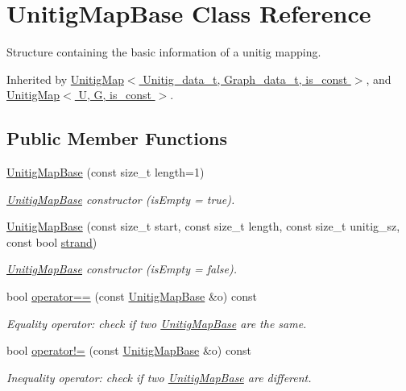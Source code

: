 \hypertarget{structUnitigMapBase}{}\section{Unitig\+Map\+Base Class Reference}
\label{structUnitigMapBase}


Structure containing the basic information of a unitig mapping.  




Inherited by \hyperlink{classUnitigMap}{Unitig\+Map$<$ Unitig\+\_\+data\+\_\+t, Graph\+\_\+data\+\_\+t, is\+\_\+const $>$}, and \hyperlink{classUnitigMap}{Unitig\+Map$<$ U, G, is\+\_\+const $>$}.

\subsection*{Public Member Functions}
\begin{DoxyCompactItemize}
\item 
\hyperlink{structUnitigMapBase_a080e546f9f6a9027490501332b656473}{Unitig\+Map\+Base} (const size\+\_\+t length=1)
\begin{DoxyCompactList}\small\item\em \hyperlink{structUnitigMapBase}{Unitig\+Map\+Base} constructor (is\+Empty = true). \end{DoxyCompactList}\item 
\hyperlink{structUnitigMapBase_a04975745bfe61f5d067acb13940d2975}{Unitig\+Map\+Base} (const size\+\_\+t start, const size\+\_\+t length, const size\+\_\+t unitig\+\_\+sz, const bool \hyperlink{structUnitigMapBase_a6de6f4a1ccef220e84d097bc3ef0fb3f}{strand})
\begin{DoxyCompactList}\small\item\em \hyperlink{structUnitigMapBase}{Unitig\+Map\+Base} constructor (is\+Empty = false). \end{DoxyCompactList}\item 
bool \hyperlink{structUnitigMapBase_ac6965f7af0564e4cfa1e6a77595231c7}{operator==} (const \hyperlink{structUnitigMapBase}{Unitig\+Map\+Base} \&o) const
\begin{DoxyCompactList}\small\item\em Equality operator\+: check if two \hyperlink{structUnitigMapBase}{Unitig\+Map\+Base} are the same. \end{DoxyCompactList}\item 
bool \hyperlink{structUnitigMapBase_aa493ccbb29c318a081c4c58544f6461e}{operator!=} (const \hyperlink{structUnitigMapBase}{Unitig\+Map\+Base} \&o) const
\begin{DoxyCompactList}\small\item\em Inequality operator\+: check if two \hyperlink{structUnitigMapBase}{Unitig\+Map\+Base} are different. \end{DoxyCompactList}\end{DoxyCompactItemize}

